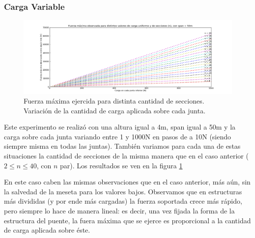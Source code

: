 \subsubsection{Carga Variable}

\begin{figure}[H]
  \centering
    \includegraphics[width=1\textwidth]{../mediciones/cargaVariableDic.png}
    \caption{Fuerza máxima ejercida para distinta cantidad de secciones. Variación de la cantidad de carga aplicada sobre cada junta.}
   \label{graf:carga} 
\end{figure}

Este experimento se realiz\'o con una altura igual a 4m,  span igual a 50m y la carga sobre cada junta variando entre 1 y 1000N en pasos de a 10N (siendo siempre misma en todas las juntas). Tambi\'en variamos para cada una de estas situaciones la cantidad de secciones de la misma manera que en el caso anterior ($2\leq n \leq 40$, con $n$ par). Los resultados se ven en la figura \ref{graf:carga}

En este caso caben las mismas observaciones que en el caso anterior, más aún, sin la salvedad de la meseta para los valores bajos. Observamos que en estructuras más divididas (y por ende más cargadas) la fuerza soportada crece más rápido, pero siempre lo hace de manera lineal: es decir, una vez fijada la forma de la estructura del puente, la fuera máxima que se ejerce es proporcional a la cantidad de carga aplicada sobre éste.